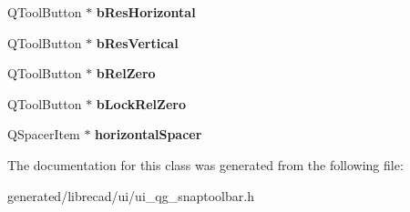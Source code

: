 \begin{DoxyCompactItemize}
\item 
\hypertarget{classUi__QG__SnapToolBar_aa1cce241289cab16d1ab2f8466c13870}{Q\-Tool\-Button $\ast$ {\bfseries b\-Res\-Horizontal}}\label{classUi__QG__SnapToolBar_aa1cce241289cab16d1ab2f8466c13870}

\item 
\hypertarget{classUi__QG__SnapToolBar_a7bcf74ce955a76109391b2effbaea988}{Q\-Tool\-Button $\ast$ {\bfseries b\-Res\-Vertical}}\label{classUi__QG__SnapToolBar_a7bcf74ce955a76109391b2effbaea988}

\item 
\hypertarget{classUi__QG__SnapToolBar_ad258f5e77f23c3e5e694760b55330337}{Q\-Tool\-Button $\ast$ {\bfseries b\-Rel\-Zero}}\label{classUi__QG__SnapToolBar_ad258f5e77f23c3e5e694760b55330337}

\item 
\hypertarget{classUi__QG__SnapToolBar_a7112acc67e9286572a0d064b0938afe6}{Q\-Tool\-Button $\ast$ {\bfseries b\-Lock\-Rel\-Zero}}\label{classUi__QG__SnapToolBar_a7112acc67e9286572a0d064b0938afe6}

\item 
\hypertarget{classUi__QG__SnapToolBar_a3cdb70aa3d3cdc2ff5515bd74a161b37}{Q\-Spacer\-Item $\ast$ {\bfseries horizontal\-Spacer}}\label{classUi__QG__SnapToolBar_a3cdb70aa3d3cdc2ff5515bd74a161b37}

\end{DoxyCompactItemize}


The documentation for this class was generated from the following file\-:\begin{DoxyCompactItemize}
\item 
generated/librecad/ui/ui\-\_\-qg\-\_\-snaptoolbar.\-h\end{DoxyCompactItemize}
